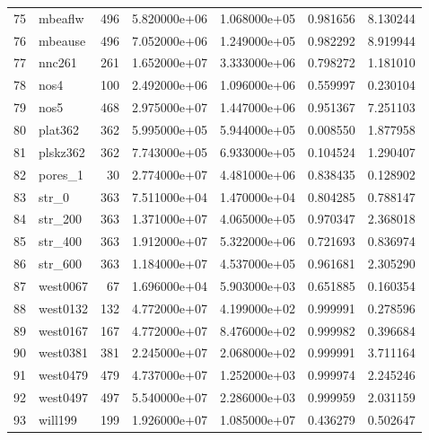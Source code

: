 \begin{tabular}{llrrrrr}
75  &                  mbeaflw &   496 &  5.820000e+06 &  1.068000e+05 &  0.981656 &   8.130244 \\
76  &                  mbeause &   496 &  7.052000e+06 &  1.249000e+05 &  0.982292 &   8.919944 \\
77  &                   nnc261 &   261 &  1.652000e+07 &  3.333000e+06 &  0.798272 &   1.181010 \\
78  &                     nos4 &   100 &  2.492000e+06 &  1.096000e+06 &  0.559997 &   0.230104 \\
79  &                     nos5 &   468 &  2.975000e+07 &  1.447000e+06 &  0.951367 &   7.251103 \\
80  &                  plat362 &   362 &  5.995000e+05 &  5.944000e+05 &  0.008550 &   1.877958 \\
81  &                 plskz362 &   362 &  7.743000e+05 &  6.933000e+05 &  0.104524 &   1.290407 \\
82  &                  pores\_1 &    30 &  2.774000e+07 &  4.481000e+06 &  0.838435 &   0.128902 \\
83  &                    str\_0 &   363 &  7.511000e+04 &  1.470000e+04 &  0.804285 &   0.788147 \\
84  &                  str\_200 &   363 &  1.371000e+07 &  4.065000e+05 &  0.970347 &   2.368018 \\
85  &                  str\_400 &   363 &  1.912000e+07 &  5.322000e+06 &  0.721693 &   0.836974 \\
86  &                  str\_600 &   363 &  1.184000e+07 &  4.537000e+05 &  0.961681 &   2.305290 \\
87  &                 west0067 &    67 &  1.696000e+04 &  5.903000e+03 &  0.651885 &   0.160354 \\
88  &                 west0132 &   132 &  4.772000e+07 &  4.199000e+02 &  0.999991 &   0.278596 \\
89  &                 west0167 &   167 &  4.772000e+07 &  8.476000e+02 &  0.999982 &   0.396684 \\
90  &                 west0381 &   381 &  2.245000e+07 &  2.068000e+02 &  0.999991 &   3.711164 \\
91  &                 west0479 &   479 &  4.737000e+07 &  1.252000e+03 &  0.999974 &   2.245246 \\
92  &                 west0497 &   497 &  5.540000e+07 &  2.286000e+03 &  0.999959 &   2.031159 \\
93  &                  will199 &   199 &  1.926000e+07 &  1.085000e+07 &  0.436279 &   0.502647 \\

\end{tabular}
